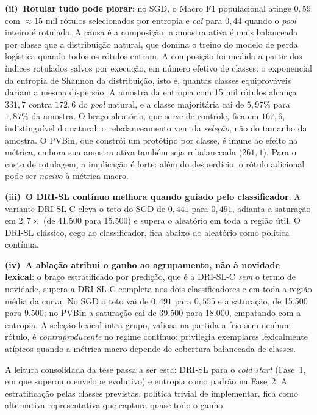 \textbf{(ii)~Rotular tudo pode piorar}: no
SGD, o Macro F1 populacional atinge $0{,}59$ com $\approx 15$ mil rótulos
selecionados por entropia e \emph{cai} para $0{,}44$ quando o \textit{pool}
inteiro é rotulado. A causa é a composição: a amostra ativa é mais balanceada
por classe que a distribuição natural, que domina o treino do modelo de perda
logística quando todos os rótulos entram. A composição foi medida a partir dos índices rotulados salvos por execução, em
número efetivo de classes: o exponencial da entropia de Shannon da
distribuição, isto é, quantas classes equiprováveis dariam a mesma dispersão.
A amostra da entropia com 15 mil rótulos alcança $331{,}7$ contra $172{,}6$ do
\textit{pool} natural, e a classe majoritária cai de $5{,}97\%$ para $1{,}87\%$
da amostra. O braço aleatório, que serve de controle, fica em $167{,}6$,
indistinguível do natural: o rebalanceamento vem da \emph{seleção}, não do
tamanho da amostra. O PVBin,
que constrói um protótipo por classe, é imune ao efeito na métrica, embora
sua amostra ativa também seja rebalanceada ($261{,}1$). Para o
custo de rotulagem, a implicação é forte: além do desperdício, o rótulo
adicional pode ser \emph{nocivo} à métrica macro.

\textbf{(iii)~O DRI-SL contínuo melhora quando guiado pelo classificador}.
A variante DRI-SL-C eleva o teto do SGD de $0{,}441$ para $0{,}491$, adianta a
saturação em $2{,}7\times$ (de 41.500 para 15.500) e supera o aleatório em toda
a região útil. O DRI-SL clássico, cego ao classificador, fica abaixo do
aleatório como política contínua.

\textbf{(iv)~A ablação atribui o ganho ao
agrupamento, não à novidade lexical}: o braço estratificado por predição, que
é a DRI-SL-C \emph{sem} o termo de novidade, supera a DRI-SL-C completa nos
dois classificadores e em toda a região média da curva. No SGD o teto vai de
$0{,}491$ para $0{,}555$ e a saturação, de 15.500 para 9.500; no PVBin a
saturação cai de 39.500 para 18.000, empatando com a entropia. A seleção lexical
intra-grupo, valiosa na partida a frio sem nenhum rótulo, é
\emph{contraproducente} no regime contínuo: privilegia exemplares
lexicalmente atípicos quando a métrica macro depende de cobertura
balanceada de classes.

A leitura consolidada da tese passa a ser esta: DRI-SL para o \textit{cold
start} (Fase~1, em que superou o envelope evolutivo) e entropia como padrão na
Fase~2. A estratificação pelas classes previstas, política trivial de
implementar, fica como alternativa representativa que captura quase todo o
ganho.

